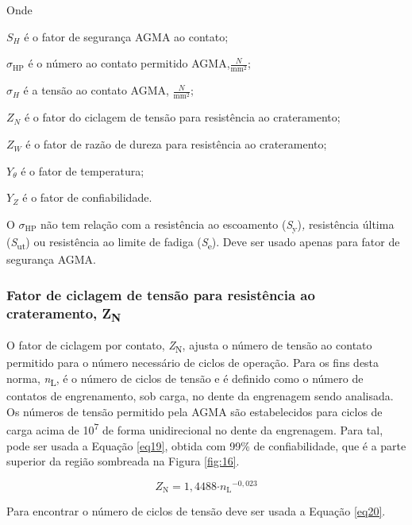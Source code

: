\documentclass[12pt,a4paper]{article}
\begin{document}
Onde

\(S_{H}\) é o fator de segurança AGMA ao contato;

\(\sigma_{\text{HP}}\) é o número ao contato permitido
AGMA,\(\frac{N}{\text{mm}^{2}}\);

\(\sigma_{H}\) é a tensão ao contato AGMA, \(\frac{N}{\text{mm}^{2}};\)

\(Z_{N}\) é o fator do ciclagem de tensão para resistência ao
crateramento;

\(Z_{W}\) é o fator de razão de dureza para resistência ao
crateramento;

\(Y_{\theta}\) é o fator de temperatura;

\(Y_{Z}\) é o fator de confiabilidade.

O \(\sigma_{\text{HP}}\) não tem relação com a resistência ao escoamento
(\emph{S}\textsubscript{y})\emph{,} resistência última
(\emph{S}\textsubscript{ut}) ou resistência ao limite de fadiga
(\emph{S}\textsubscript{e}). Deve ser usado apenas para fator de
segurança AGMA.

\subsubsection*{\texorpdfstring{Fator de ciclagem de tensão para
resistência ao crateramento,
Z\textsubscript{N}}{Fator de ciclagem de tensão para resistência ao crateramento, ZN}}

{\label{fator-de-ciclagem-de-tensuxe3o-para-resistuxeancia-ao-crateramento-zn}}

O fator de ciclagem por contato, \emph{Z}\textsubscript{N}, ajusta o
número de tensão ao contato permitido para o número necessário de ciclos
de operação. Para os fins desta norma, \emph{n}\textsubscript{L}, é o
número de ciclos de tensão e é definido como o número de contatos de
engrenamento, sob carga, no dente da engrenagem sendo analisada. Os
números de tensão permitido pela AGMA são estabelecidos para ciclos de
carga acima de 10\textsuperscript{7} de forma unidirecional no dente da
engrenagem. Para tal, pode ser usada a Equação
{\ref{eq19}}, obtida com 99\% de confiabilidade, que é
a parte superior da região sombreada na Figura
{\ref{fig:16}}.

\begin{equation}
\label{eq19}
Z_{\mathrm{N}}\mathrm{=1,4488}\mathrm{\cdot }{n_{\mathrm{L}}}^{\mathrm{-}\mathrm{0,023}}
\end{equation}

Para encontrar o número de ciclos de tensão deve ser usada a Equação
{\ref{eq20}}.
\end{document}
